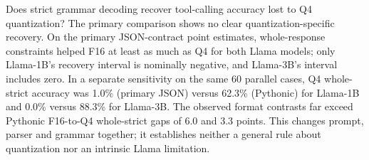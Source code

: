 Does strict grammar decoding recover tool-calling accuracy lost to Q4 quantization? The primary comparison shows no clear quantization-specific recovery. On the primary JSON-contract point estimates, whole-response constraints helped F16 at least as much as Q4 for both Llama models; only Llama-1B's recovery interval is nominally negative, and Llama-3B's interval includes zero. In a separate sensitivity on the same 60 parallel cases, Q4 whole-strict accuracy was 1.0\% (primary JSON) versus 62.3\% (Pythonic) for Llama-1B and 0.0\% versus 88.3\% for Llama-3B. The observed format contrasts far exceed Pythonic F16-to-Q4 whole-strict gaps of 6.0 and 3.3 points. This changes prompt, parser and grammar together; it establishes neither a general rule about quantization nor an intrinsic Llama limitation.
